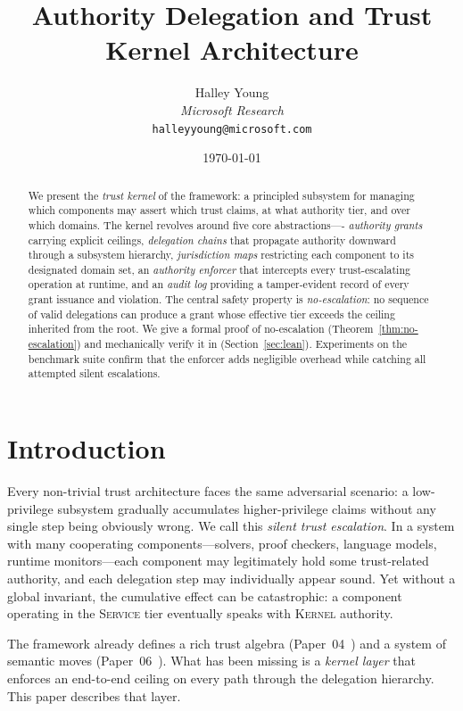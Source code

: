 \documentclass[11pt]{article}
\title{Authority Delegation and Trust Kernel Architecture}
\author{%
  Halley Young\\
  \textit{Microsoft Research}\\
  \texttt{halleyyoung@microsoft.com}
}
\date{\today}
\newcommand{\TierKERNEL}{\textsc{Kernel}}
\newcommand{\TierSERVICE}{\textsc{Service}}
\begin{document}
\maketitle

\begin{abstract}
We present the \emph{trust kernel} of the \JuGeo{} framework: a
principled subsystem for managing which components may assert which
trust claims, at what authority tier, and over which domains.
The kernel revolves around five core abstractions—-%
\emph{authority grants} carrying explicit ceilings,
\emph{delegation chains} that propagate authority downward through
a subsystem hierarchy,
\emph{jurisdiction maps} restricting each component to its designated
domain set,
an \emph{authority enforcer} that intercepts every trust-escalating
operation at runtime, and
an \emph{audit log} providing a tamper-evident record of every grant
issuance and violation.
The central safety property is \emph{no-escalation}: no sequence of
valid delegations can produce a grant whose effective tier exceeds the
ceiling inherited from the root.  We give a formal proof of
no-escalation (Theorem~\ref{thm:no-escalation}) and mechanically
verify it in \LEAN{} (Section~\ref{sec:lean}).  Experiments on the
\JuGeo{} benchmark suite confirm that the enforcer adds negligible
overhead while catching all attempted silent escalations.
\end{abstract}

\newpage

\section{Introduction}\label{sec:intro}

Every non-trivial trust architecture faces the same adversarial
scenario: a low-privilege subsystem gradually accumulates
higher-privilege claims without any single step being obviously
wrong.  We call this \emph{silent trust escalation}.  In a system
with many cooperating components---solvers, proof checkers, language
models, runtime monitors---each component may legitimately hold some
trust-related authority, and each delegation step may individually
appear sound.  Yet without a global invariant, the cumulative effect
can be catastrophic: a component operating in the \TierSERVICE{} tier
eventually speaks with \TierKERNEL{} authority.

The \JuGeo{} framework already defines a rich trust algebra
(Paper~04~\cite{paper04}) and a system of semantic moves
(Paper~06~\cite{paper06}).  What has been missing is a
\emph{kernel layer} that enforces an end-to-end ceiling on every
path through the delegation hierarchy.
This paper describes that layer.
\end{document}
